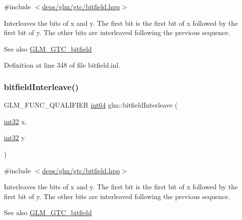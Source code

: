 {\ttfamily \#include $<$\hyperlink{bitfield_8hpp}{deps/glm/gtc/bitfield.\+hpp}$>$}

Interleaves the bits of x and y. The first bit is the first bit of x followed by the first bit of y. The other bits are interleaved following the previous sequence.

\begin{DoxySeeAlso}{See also}
\hyperlink{group__gtc__bitfield}{G\+L\+M\+\_\+\+G\+T\+C\+\_\+bitfield} 
\end{DoxySeeAlso}


Definition at line 348 of file bitfield.\+inl.

\mbox{\label{group__gtc__bitfield_ga0de51d5985e6a703f305a5a61479babd}} 
\subsubsection{\texorpdfstring{bitfield\+Interleave()}{bitfieldInterleave()}\hspace{0.1cm}{\footnotesize\ttfamily [5/16]}}
{\footnotesize\ttfamily G\+L\+M\+\_\+\+F\+U\+N\+C\+\_\+\+Q\+U\+A\+L\+I\+F\+I\+ER \hyperlink{group__gtc__type__precision_ga435d75819cce297cc5fa21bd84ef89a5}{int64} glm\+::bitfield\+Interleave (\begin{DoxyParamCaption}\item[{\hyperlink{group__gtc__type__precision_ga632d8b25f6b61659f39ea4321fab92a4}{int32}}]{x,  }\item[{\hyperlink{group__gtc__type__precision_ga632d8b25f6b61659f39ea4321fab92a4}{int32}}]{y }\end{DoxyParamCaption})}



{\ttfamily \#include $<$\hyperlink{bitfield_8hpp}{deps/glm/gtc/bitfield.\+hpp}$>$}

Interleaves the bits of x and y. The first bit is the first bit of x followed by the first bit of y. The other bits are interleaved following the previous sequence.

\begin{DoxySeeAlso}{See also}
\hyperlink{group__gtc__bitfield}{G\+L\+M\+\_\+\+G\+T\+C\+\_\+bitfield} 
\end{DoxySeeAlso}


